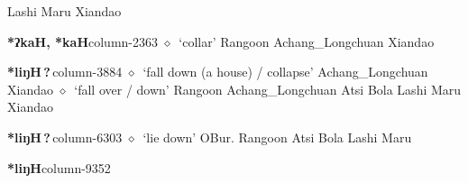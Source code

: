          Lashi 
\hspace{1ex}
         Maru 
\hspace{1ex}
         Xiandao 
  \item {\footnotesize \textbf{*ʔkaH, *kaH}}{\tiny column-2363}
         $\diamond$~`collar'
         Rangoon 
\hspace{1ex}
         Achang\_Longchuan 
\hspace{1ex}
         Xiandao 
  \item {\footnotesize \textbf{*liŋH\,?\,}}{\tiny column-3884}
         $\diamond$~`fall down (a house) / collapse'
         Achang\_Longchuan 
\hspace{1ex}
         Xiandao 
\hspace{1ex}
         $\diamond$~`fall over / down'
         Rangoon 
\hspace{1ex}
         Achang\_Longchuan 
\hspace{1ex}
         Atsi 
\hspace{1ex}
         Bola 
\hspace{1ex}
         Lashi 
\hspace{1ex}
         Maru 
\hspace{1ex}
         Xiandao 
  \item {\footnotesize \textbf{*liŋH\,?\,}}{\tiny column-6303}
         $\diamond$~`lie down'
         OBur. 
\hspace{1ex}
         Rangoon 
\hspace{1ex}
         Atsi 
\hspace{1ex}
         Bola 
\hspace{1ex}
         Lashi 
\hspace{1ex}
         Maru 
  \item {\footnotesize \textbf{*liŋH}}{\tiny column-9352}
